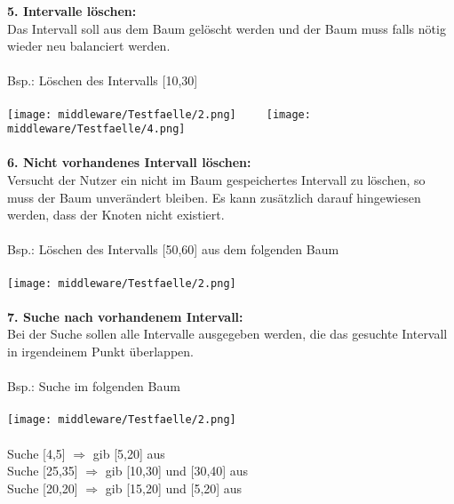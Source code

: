\documentclass{scrartcl}
\begin{document}
\textbf{5. Intervalle löschen:}\\
Das Intervall soll aus dem Baum gelöscht werden und der Baum muss falls nötig wieder neu balanciert werden.\\\\
Bsp.: Löschen des Intervalls [10,30]\\\\
\texttt{[image: middleware/Testfaelle/2.png]}$~~~~~~~~~~~$\texttt{[image: middleware/Testfaelle/4.png]}\\\\
\textbf{6. Nicht vorhandenes Intervall löschen:}\\
Versucht der Nutzer ein nicht im Baum gespeichertes Intervall zu löschen, so muss der Baum unverändert bleiben. Es kann zusätzlich darauf hingewiesen werden, dass der Knoten nicht existiert.\\\\
Bsp.: Löschen des Intervalls [50,60] aus dem folgenden Baum\\\\
\texttt{[image: middleware/Testfaelle/2.png]}\\\\
\textbf{7. Suche nach vorhandenem Intervall:}\\
Bei der Suche sollen alle Intervalle ausgegeben werden, die das gesuchte Intervall in irgendeinem Punkt überlappen.\\\\
Bsp.: Suche im folgenden Baum\\\\
\texttt{[image: middleware/Testfaelle/2.png]}\\\\Suche [4,5] $\Rightarrow$ gib [5,20] aus\\
Suche [25,35] $\Rightarrow$ gib [10,30] und [30,40] aus\\
Suche [20,20] $\Rightarrow$ gib [15,20] und [5,20] aus
\end{document}
